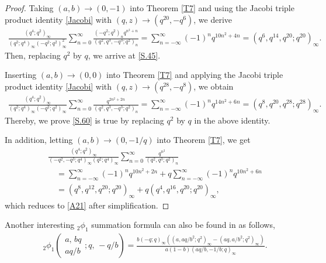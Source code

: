 \documentclass[reqno,12pt]{amsart}
\theoremstyle{remark}
\numberwithin{equation}{section}
\begin{document}
\begin{proof}
Taking $\left(a,b\right)\to\left(0,-1\right)$ into Theorem \ref{T7} and using the Jacobi triple product identity \eqref{Jacobi} with $\left(q,z\right)\to\left(q^{20},-q^6\right)$, we derive
\begin{align*}
\frac{\left(q^4;q^2\right)_{\infty}}
{\left(q^2;q^4\right)_{\infty}\left(-q^2;q^2\right)^2_{\infty}}
\sum_{n=0}^{\infty}\frac{\left(-q^2;q^2\right)_nq^{n^2+n}}
{\left(q^2,q^3,-q^3;q^2\right)_{n}}
=\sum_{n=-\infty}^{\infty}\left(-1\right)^nq^{10n^2+4n}
=\left(q^6,q^{14},q^{20};q^{20}\right)_{\infty}.
\end{align*}
Then, replacing $q^2$ by $q$, we arrive at \eqref{S.45}.

Inserting $\left(a,b\right)\to\left(0,0\right)$ into Theorem \ref{T7} and applying the Jacobi triple product identity \eqref{Jacobi} with $\left(q,z\right)\to\left(q^{28},-q^8\right)$, we obtain
\begin{align*}
\frac{\left(q^4;q^2\right)_{\infty}}
{\left(q^2;q^4\right)_{\infty}\left(-q^2;q^2\right)_{\infty}}
\sum_{n=0}^{\infty}\frac{q^{2n^2+2n}}{\left(q^2,q^3,-q^3;q^2\right)_{n}}
=\sum_{n=-\infty}^{\infty}\left(-1\right)^nq^{14n^2+6n}
=\left(q^8,q^{20},q^{28};q^{28}\right)_{\infty}.
\end{align*}
Thereby, we prove \eqref{S.60} is true by replacing $q^2$ by $q$ in the above identity.

In addition, letting $\left(a,b\right)\to\left(0,-1/q\right)$ into Theorem \ref{T7}, we get
\begin{align*}
&\frac{\left(q^4;q^2\right)_{\infty}}
{\left(-q^2,-q^3;q^4\right)_{\infty}\left(q^2;q^4\right)_{\infty}}
\sum_{n=0}^{\infty}\frac{q^{n^2}}{\left(q^2,q^3;q^2\right)_{n}}\\
&\quad=\sum_{n=-\infty}^{\infty}\left(-1\right)^nq^{10n^2+2n}+q\sum_{n=-\infty}^{\infty}\left(-1\right)^nq^{10n^2+6n}\\
&\quad=\left(q^8,q^{12},q^{20};q^{20}\right)_{\infty}+q\left(q^4,q^{16},q^{20};q^{20}\right)_{\infty},
\end{align*}
which reduces to \eqref{A21} after simplification.
\end{proof}
Another interesting  $_2\phi_1$ summation formula can also be  found in \cite[Eq. (6.110)]{Harsh} as follows,
\begin{align}
&{_2\phi_1}\left(
\begin{array}{cc}
a,\,bq\\
aq/b
\end{array};q,\,-q/b\right)=\frac{b\left(-q;q\right)_{\infty}\left(
\left(a,aq/b^2;q^2\right)_{\infty}-
\left(aq,a/b^2;q^2\right)_{\infty}\right)}{a\left(1-b\right)
\left(aq/b,-1/b;q\right)_{\infty}}.\label{C3}
\end{align}
\end{document}
